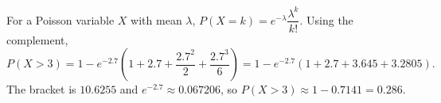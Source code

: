 For a Poisson variable $X$ with mean $\lambda$, $P(X=k)=e^{-\lambda}\dfrac{\lambda^k}{k!}$. Using the complement,
\[P(X>3)=1-e^{-2.7}\left(1+2.7+\dfrac{2.7^2}{2}+\dfrac{2.7^3}{6}\right)=1-e^{-2.7}(1+2.7+3.645+3.2805).\]
The bracket is $10.6255$ and $e^{-2.7}\approx0.067206$, so $P(X>3)\approx1-0.7141=\boxed{0.286}$.

